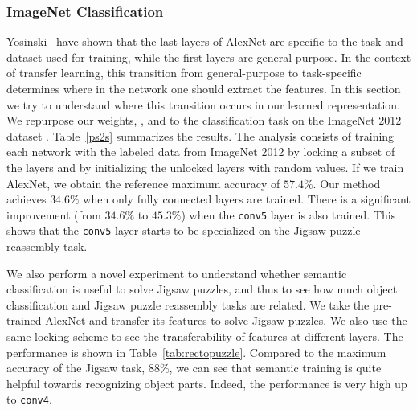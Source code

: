 \documentclass[runningheads]{llncs}
\begin{document}
\subsubsection{ImageNet Classification}

Yosinski~\etal \cite{Yosinski} have shown that the last layers of AlexNet are specific to the task and dataset used for training, while the first layers are general-purpose. In the context of transfer learning, this transition from general-purpose to task-specific determines where in the network one should extract the features. In this section we try to understand where this transition occurs in our learned representation. We repurpose our weights, \cite{Carl2015}, and \cite{Gupta15} to the classification task on the ImageNet 2012 dataset \cite{dengDSLLF09}. Table~\ref{ps2s} summarizes the results. The analysis consists of training each network with the labeled data from ImageNet 2012 by locking a subset of the layers and by initializing the unlocked layers with random values. 
If we train AlexNet, we obtain the reference maximum accuracy of $57.4\%$. Our method achieves $34.6\%$ when only fully connected layers are trained. There is a significant improvement (from $34.6\%$ to $45.3\%$) when the \texttt{conv5} layer is also trained. This shows that the \texttt{conv5} layer starts to be specialized on the Jigsaw puzzle reassembly task.

We also perform a novel experiment to understand whether semantic classification is useful to solve Jigsaw puzzles, and thus to see how much object classification and Jigsaw puzzle reassembly tasks are related. We take the pre-trained AlexNet and transfer its features to solve Jigsaw puzzles. We also use the same locking scheme to see the transferability of features at different layers. The performance is shown in Table~\ref{tab:rectopuzzle}. Compared to the maximum accuracy of the Jigsaw task, $88\%$, we can see that semantic training is quite helpful towards recognizing object parts. Indeed, the performance is very high up to \texttt{conv4}.
\end{document}
